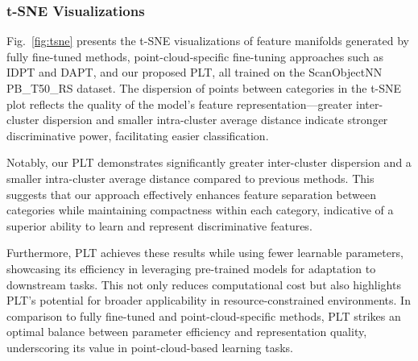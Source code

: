 \subsubsection{t-SNE Visualizations}  
Fig.~\ref{fig:tsne} presents the t-SNE visualizations of feature manifolds generated by fully fine-tuned methods, point-cloud-specific fine-tuning approaches such as IDPT and DAPT, and our proposed PLT, all trained on the ScanObjectNN PB\_T50\_RS dataset. The dispersion of points between categories in the t-SNE plot reflects the quality of the model's feature representation—greater inter-cluster dispersion and smaller intra-cluster average distance indicate stronger discriminative power, facilitating easier classification.

Notably, our PLT demonstrates significantly greater inter-cluster dispersion and a smaller intra-cluster average distance compared to previous methods. This suggests that our approach effectively enhances feature separation between categories while maintaining compactness within each category, indicative of a superior ability to learn and represent discriminative features.

Furthermore, PLT achieves these results while using fewer learnable parameters, showcasing its efficiency in leveraging pre-trained models for adaptation to downstream tasks. This not only reduces computational cost but also highlights PLT's potential for broader applicability in resource-constrained environments. In comparison to fully fine-tuned and point-cloud-specific methods, PLT strikes an optimal balance between parameter efficiency and representation quality, underscoring its value in point-cloud-based learning tasks.




